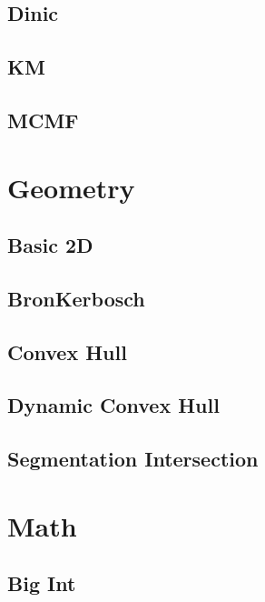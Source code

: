\documentclass[a4paper,10pt,twocolumn,oneside]{article}
\begin{document}
\subsection{Dinic}


\subsection{KM}


\subsection{MCMF}


\section{Geometry}
\subsection{Basic 2D}


\subsection{BronKerbosch}


\subsection{Convex Hull}


\subsection{Dynamic Convex Hull}


\subsection{Segmentation Intersection}


\section{Math}
\subsection{Big Int}

\end{document}
